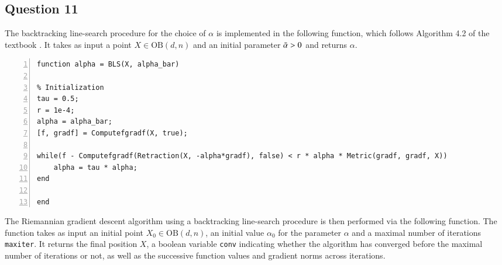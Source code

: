 \documentclass{article}
\begin{document}
\subsection*{Question 11}
The backtracking line-search procedure for the choice of $\alpha$ is implemented in the following function, which follows Algorithm 4.2 of the textbook \cite{boumal2023intromanifolds}. It takes as input a point $X\in\text{OB}(d, n)$ and an initial parameter $\Bar{\alpha}>0$ and returns $\alpha$.\\
\begin{lstlisting}[style=Matlab-editor, numbers=left, frame=single, backgroundcolor=\color{gray!5}]
function alpha = BLS(X, alpha_bar)

% Initialization
tau = 0.5;
r = 1e-4;
alpha = alpha_bar;
[f, gradf] = Computefgradf(X, true);

while(f - Computefgradf(Retraction(X, -alpha*gradf), false) < r * alpha * Metric(gradf, gradf, X))
    alpha = tau * alpha;
end

end
\end{lstlisting}
The Riemannian gradient descent algorithm using a backtracking line-search procedure is then performed via the following function. The function takes as input an initial point $X_0\in\text{OB}(d, n)$, an initial value $\alpha_0$ for the parameter $\alpha$ and a maximal number of iterations \texttt{maxiter}. It returns the final position $X$, a boolean variable \texttt{conv} indicating whether the algorithm has converged before the maximal number of iterations or not, as well as the successive function values and gradient norms across iterations.\\
\end{document}
